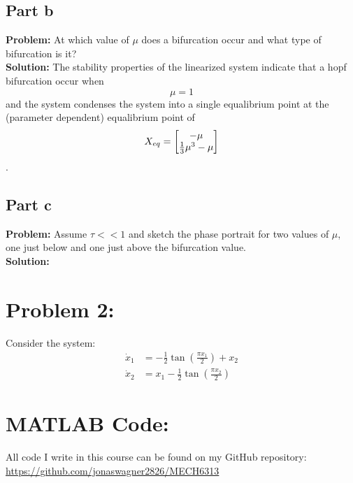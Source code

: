 \documentclass[letter]{article}
\numberwithin{equation}{section}
\begin{document}
\newpage
\subsection{Part b}
\textbf{Problem:}
At which value of $\mu$ does a bifurcation occur and what type of bifurcation is it?\\

\noindent
\textbf{Solution:}
The stability properties of the linearized system indicate that a hopf bifurcation occur when $$\mu = 1$$ and the system condenses the system into a single equalibrium point at the (parameter dependent) equalibrium point of $$X_{eq} = \mqty[-\mu\\\frac{1}{3}\mu^3 - \mu]$$.


\subsection{Part c}
\textbf{Problem:}
Assume $\tau << 1$ and sketch the phase portrait for two values of $\mu$, one just below and one just above the bifurcation value.\\

\textbf{Solution:}














\newpage
\section{Problem 2:}
Consider the system:
\begin{equation}
	\begin{aligned}
		\dot{x}_1 &= -\frac{1}{2} \tan(\frac{\pi x_1}{2}) + x_2\\
		\dot{x}_2 &= x_1 -\frac{1}{2} \tan(\frac{\pi x_2}{2})
	\end{aligned}
\end{equation}












\newpage
\appendix
\section{MATLAB Code:}\label{apx:matlab}
All code I write in this course can be found on my GitHub repository:\\
\href{https://github.com/jonaswagner2826/MECH6313}{https://github.com/jonaswagner2826/MECH6313}
%
\end{document}
